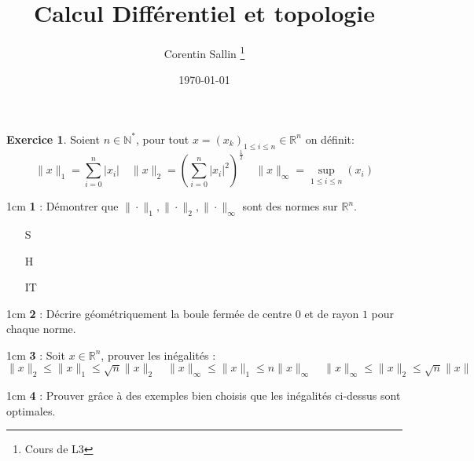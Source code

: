 \documentclass{report}
\date{\today}
\author{Corentin Sallin \thanks{Cours de L3}}
\title{Calcul Différentiel et topologie}
\newcommand{\N}{\mathbb{N}}
\newcommand{\R}{\mathbb{R}}
\theoremstyle{definition}
\newtheorem{exo}{Exercice}
\newenvironment{q}[1]{
    \begin{adjustwidth}{1cm}{}
    \textbf{#1} : }{
    \end{adjustwidth}}
\begin{document}
\begin{exo}
    Soient \(n \in\N^*\), pour tout \(x=(x_k)_{1\leq i\leq n} \in \R^n\) on définit:
    \[\|x\|_1 = \sum_{i=0}^n |x_i| \quad \|x\|_2=\left(\sum_{i=0}^n |x_i|^2\right)^\frac{1}{2} \quad \|x\|_\infty = \sup_{1\leq i \leq n}\left(x_i\right)\]

    \begin{q}{1}
        Démontrer que \(\|\cdot\|_1, \|\cdot\|_2, \|\cdot\|_\infty\) sont des normes sur \(\R^n\).
        \begin{enumerate}[leftmargin=1cm]
            \item[S]
            \item[H]
            \item[IT]
        \end{enumerate}
    \end{q}

    \begin{q}{2}
        Décrire géométriquement la boule fermée de centre \(0\) et de rayon \(1\) pour chaque norme.
    \end{q}
    \begin{q}{3}
        Soit \(x\in\R^n\), prouver les inégalités :
    \[\|x\|_2\leq\|x\|_1\leq\sqrt{n}\|x\|_2\quad\|x\|_\infty\leq\|x\|_1\leq n\|x\|_\infty\quad\|x\|_\infty\leq \|x\|_2\leq\sqrt{n}\|x\|\]
    \end{q}
    \begin{q}{4}
        Prouver grâce à des exemples bien choisis que les inégalités ci-dessus sont optimales.
    \end{q}
\end{exo}
\end{document}
